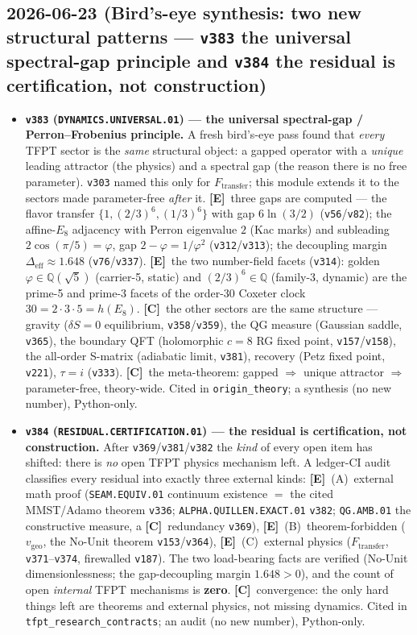 \documentclass[11pt]{article}
\providecommand{\mE}{\textbf{[E]}}\providecommand{\mC}{\textbf{[C]}}
\providecommand{\vref}[1]{\texttt{#1}}
\begin{document}
\subsection*{2026-06-23 (Bird's-eye synthesis: two new structural patterns --- \texttt{v383} the universal spectral-gap principle and \texttt{v384} the residual is certification, not construction)}
\begin{itemize}
\item \textbf{\texttt{v383} (\texttt{DYNAMICS.UNIVERSAL.01}) --- the universal spectral-gap / Perron--Frobenius principle.}
A fresh bird's-eye pass found that \emph{every} TFPT sector is the \emph{same} structural object: a gapped operator with
a \emph{unique} leading attractor (the physics) and a spectral gap (the reason there is no free parameter).
\vref{v303} named this only for $F_{\mathrm{transfer}}$; this module extends it to the sectors made parameter-free
\emph{after} it. \mE\ three gaps are computed --- the flavor transfer $\{1,(2/3)^6,(1/3)^6\}$ with gap $6\ln(3/2)$
(\vref{v56}/\vref{v82}); the affine-$E_8$ adjacency with Perron eigenvalue $2$ (Kac marks) and subleading
$2\cos(\pi/5)=\varphi$, gap $2-\varphi=1/\varphi^2$ (\vref{v312}/\vref{v313}); the decoupling margin
$\Delta_{\mathrm{eff}}\approx1.648$ (\vref{v76}/\vref{v337}). \mE\ the two number-field facets (\vref{v314}): golden
$\varphi\in\mathbb Q(\sqrt5)$ (carrier-5, static) and $(2/3)^6\in\mathbb Q$ (family-3, dynamic) are the prime-5 and
prime-3 facets of the order-30 Coxeter clock $30=2{\cdot}3{\cdot}5=h(E_8)$. \mC\ the other sectors are the same
structure --- gravity ($\delta S{=}0$ equilibrium, \vref{v358}/\vref{v359}), the QG measure (Gaussian saddle,
\vref{v365}), the boundary QFT (holomorphic $c{=}8$ RG fixed point, \vref{v157}/\vref{v158}), the all-order S-matrix
(adiabatic limit, \vref{v381}), recovery (Petz fixed point, \vref{v221}), $\tau{=}i$ (\vref{v333}). \mC\ the
meta-theorem: gapped $\Rightarrow$ unique attractor $\Rightarrow$ parameter-free, theory-wide. Cited in
\texttt{origin\_theory}; a synthesis (no new number), Python-only.
\item \textbf{\texttt{v384} (\texttt{RESIDUAL.CERTIFICATION.01}) --- the residual is certification, not construction.}
After \vref{v369}/\vref{v381}/\vref{v382} the \emph{kind} of every open item has shifted: there is \emph{no} open TFPT
physics mechanism left. A ledger-CI audit classifies every residual into exactly three external kinds: \mE\ (A)~external
math proof (\texttt{SEAM.EQUIV.01} continuum existence $=$ the cited MMST/Adamo theorem \vref{v336};
\texttt{ALPHA.QUILLEN.EXACT.01} \vref{v382}; \texttt{QG.AMB.01} the constructive measure, a \mC\ redundancy \vref{v369}),
\mE\ (B)~theorem-forbidden ($v_{\mathrm{geo}}$, the No-Unit theorem \vref{v153}/\vref{v364}), \mE\ (C)~external physics
($F_{\mathrm{transfer}}$, \vref{v371}--\vref{v374}, firewalled \vref{v187}). The two load-bearing facts are verified
(No-Unit dimensionlessness; the gap-decoupling margin $1.648>0$), and the count of open \emph{internal} TFPT mechanisms
is \textbf{zero}. \mC\ convergence: the only hard things left are theorems and external physics, not missing dynamics.
Cited in \texttt{tfpt\_research\_contracts}; an audit (no new number), Python-only.
\end{itemize}
\end{document}
